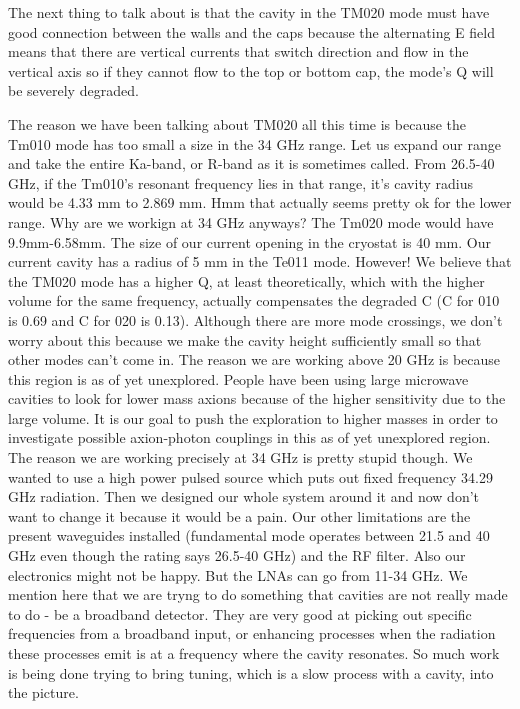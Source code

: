 \documentclass[11pt]{article}
\begin{document}
The next thing to talk about is that the cavity in the TM020 mode must have good connection between the walls and the caps because the alternating E field means that there are vertical currents that switch direction and flow in the vertical axis so if they cannot flow to the top or bottom cap, the mode's Q will be severely degraded.

The reason we have been talking about TM020 all this time is because the Tm010 mode has too small a size in the 34 GHz range. Let us expand our range and take the entire Ka-band, or R-band as it is sometimes called. From 26.5-40 GHz, if the Tm010's resonant frequency lies in that range, it's cavity radius would be 4.33 mm to 2.869 mm. Hmm that actually seems pretty ok for the lower range. Why are we workign at 34 GHz anyways? The Tm020 mode would have 9.9mm-6.58mm. The size of our current opening in the cryostat is 40 mm. Our current cavity has a radius of 5 mm in the Te011 mode.
However! We believe that the TM020 mode has a higher Q, at least theoretically, which with the higher volume for the same frequency, actually compensates the degraded C (C for 010 is 0.69 and C for 020 is 0.13). Although there are more mode crossings, we don't worry about this because we make the cavity height sufficiently small so that other modes can't come in.
The reason we are working above 20 GHz is because this region is as of yet unexplored. People have been using large microwave cavities to look for lower mass axions because of the higher sensitivity due to the large volume. It is our goal to push the exploration to higher masses in order to investigate possible axion-photon couplings in this as of yet unexplored region.
The reason we are working precisely at 34 GHz is pretty stupid though. We wanted to use a high power pulsed source which puts out fixed frequency 34.29 GHz radiation. Then we designed our whole system around it and now don't want to change it because it would be a pain.
Our other limitations are the present waveguides installed (fundamental mode operates between 21.5 and 40 GHz even though the rating says 26.5-40 GHz) and the RF filter. Also our electronics might not be happy. But the LNAs can go from 11-34 GHz.
We mention here that we are tryng to do something that cavities are not really made to do - be a broadband detector. They are very good at picking out specific frequencies from a broadband input, or enhancing processes when the radiation these processes emit is at a frequency where the cavity resonates. So much work is being done trying to bring tuning, which is a slow process with a cavity, into the picture.
\end{document}

